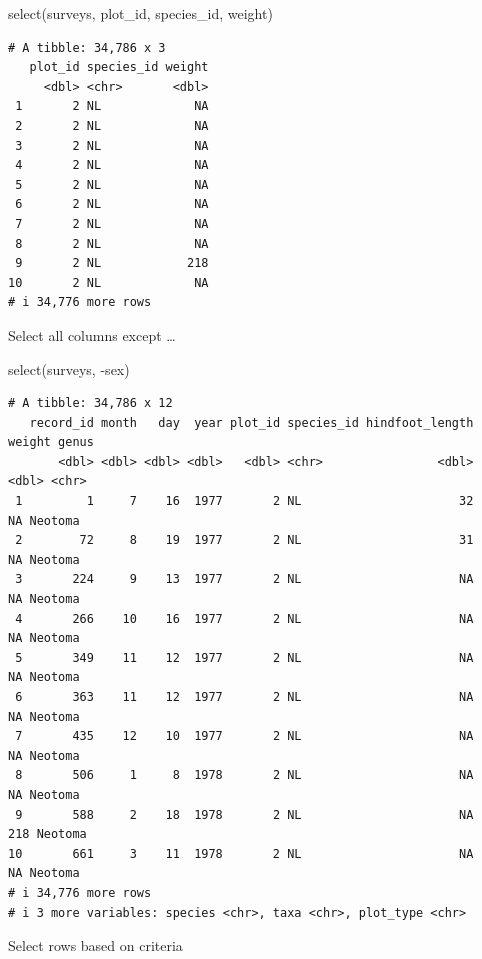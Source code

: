 \documentclass[
  letterpaper,
  DIV=11,
  numbers=noendperiod]{scrreprt}
\newenvironment{Shaded}{\begin{snugshade}}{\end{snugshade}}
\newcommand{\FunctionTok}[1]{\textcolor[rgb]{0.28,0.35,0.67}{#1}}
\newcommand{\NormalTok}[1]{\textcolor[rgb]{0.00,0.23,0.31}{#1}}
\newcommand{\SpecialCharTok}[1]{\textcolor[rgb]{0.37,0.37,0.37}{#1}}
\begin{document}
\begin{Shaded}
\begin{Highlighting}[]
\FunctionTok{select}\NormalTok{(surveys, plot\_id, species\_id, weight)}
\end{Highlighting}
\end{Shaded}

\begin{verbatim}
# A tibble: 34,786 x 3
   plot_id species_id weight
     <dbl> <chr>       <dbl>
 1       2 NL             NA
 2       2 NL             NA
 3       2 NL             NA
 4       2 NL             NA
 5       2 NL             NA
 6       2 NL             NA
 7       2 NL             NA
 8       2 NL             NA
 9       2 NL            218
10       2 NL             NA
# i 34,776 more rows
\end{verbatim}

Select all columns except \ldots{}

\begin{Shaded}
\begin{Highlighting}[]
\FunctionTok{select}\NormalTok{(surveys, }\SpecialCharTok{{-}}\NormalTok{sex)}
\end{Highlighting}
\end{Shaded}

\begin{verbatim}
# A tibble: 34,786 x 12
   record_id month   day  year plot_id species_id hindfoot_length weight genus  
       <dbl> <dbl> <dbl> <dbl>   <dbl> <chr>                <dbl>  <dbl> <chr>  
 1         1     7    16  1977       2 NL                      32     NA Neotoma
 2        72     8    19  1977       2 NL                      31     NA Neotoma
 3       224     9    13  1977       2 NL                      NA     NA Neotoma
 4       266    10    16  1977       2 NL                      NA     NA Neotoma
 5       349    11    12  1977       2 NL                      NA     NA Neotoma
 6       363    11    12  1977       2 NL                      NA     NA Neotoma
 7       435    12    10  1977       2 NL                      NA     NA Neotoma
 8       506     1     8  1978       2 NL                      NA     NA Neotoma
 9       588     2    18  1978       2 NL                      NA    218 Neotoma
10       661     3    11  1978       2 NL                      NA     NA Neotoma
# i 34,776 more rows
# i 3 more variables: species <chr>, taxa <chr>, plot_type <chr>
\end{verbatim}

Select rows based on criteria
\end{document}
